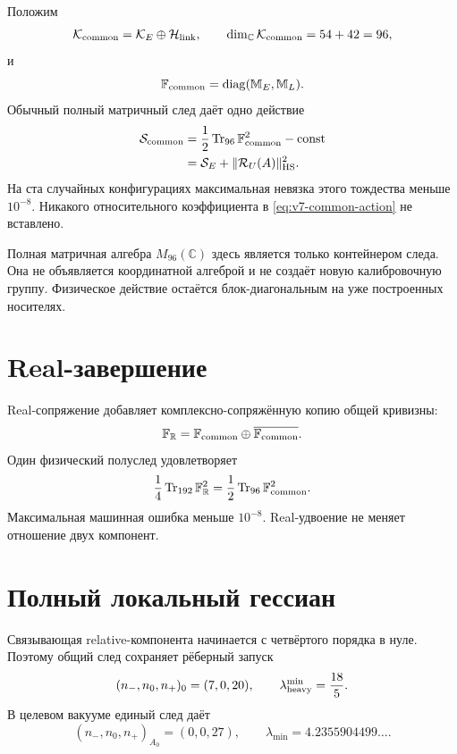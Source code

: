 Положим
\begin{equation}
 \mathcal K_{\rm common}
 =\mathcal K_E\oplus\mathcal H_{\rm link},
 \qquad
 \dim_{\mathbb C}\mathcal K_{\rm common}=54+42=96,
 \label{eq:v7-common-chain-carrier}
\end{equation}
и
\begin{equation}
 \mathbb F_{\rm common}
 =\operatorname{diag}(\mathbb M_E,\mathbb M_L).
 \label{eq:v7-common-curvature}
\end{equation}
Обычный полный матричный след даёт одно действие
\begin{align}
 \mathcal S_{\rm common}
 &=\frac12\operatorname{Tr}_{96}\mathbb F_{\rm common}^2-\text{const}\nonumber\\
 &=\mathcal S_E+\|\mathcal R_U(A)\|_{\rm HS}^2.
 \label{eq:v7-common-action}
\end{align}
На ста случайных конфигурациях максимальная невязка этого тождества меньше
$10^{-8}$. Никакого относительного коэффициента в
\eqref{eq:v7-common-action} не вставлено.

Полная матричная алгебра $M_{96}(\mathbb C)$ здесь является только
контейнером следа. Она не объявляется координатной алгеброй и не создаёт
новую калибровочную группу. Физическое действие остаётся блок-диагональным
на уже построенных носителях.

\section{Real-завершение}

Real-сопряжение добавляет комплексно-сопряжённую копию общей кривизны:
\begin{equation}
 \mathbb F_{\mathbb R}
 =\mathbb F_{\rm common}\oplus\overline{\mathbb F_{\rm common}}.
 \label{eq:v7-common-real-completion}
\end{equation}
Один физический полуслед удовлетворяет
\begin{equation}
 \frac14\operatorname{Tr}_{192}\mathbb F_{\mathbb R}^2
 =\frac12\operatorname{Tr}_{96}\mathbb F_{\rm common}^2.
 \label{eq:v7-common-real-half-trace}
\end{equation}
Максимальная машинная ошибка меньше $10^{-8}$. Real-удвоение не меняет
отношение двух компонент.

\section{Полный локальный гессиан}

Связывающая relative-компонента начинается с четвёртого порядка в нуле.
Поэтому общий след сохраняет рёберный запуск
\begin{equation}
 (n_-,n_0,n_+)_{0}=(7,0,20),
 \qquad
 \lambda_{\rm heavy}^{\min}=\frac{18}{5}.
 \label{eq:v7-common-origin-signature}
\end{equation}
В целевом вакууме единый след даёт
\begin{equation}
 (n_-,n_0,n_+)_{A_0}=(0,0,27),
 \qquad
 \lambda_{\min}=4.2355904499\ldots.
 \label{eq:v7-common-vacuum-signature}
\end{equation}

